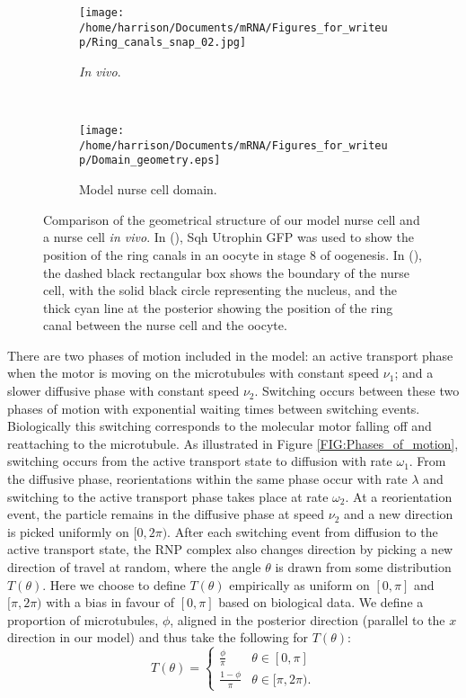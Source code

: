 \documentclass[twocolumn]{biophys}
\begin{document}
\begin{figure}[h]
 \centering
 \begin{subfigure}[b]{0.375\textwidth}
 \texttt{[image: /home/harrison/Documents/mRNA/Figures\_for\_writeup/Ring\_canals\_snap\_02.jpg]}
    \caption[]%
  {{\small \textit{In vivo}.}}    
  \label{fig:vivo}
\end{subfigure}
 ~
  \begin{subfigure}[b]{0.475\textwidth}  
      \centering 
      \texttt{[image: /home/harrison/Documents/mRNA/Figures\_for\_writeup/Domain\_geometry.eps]}
      \caption[]%
      {{\small Model nurse cell domain.}}    
      \label{fig:model}
  \end{subfigure}
  \caption{Comparison of the geometrical structure of our model nurse cell and a nurse cell \textit{in vivo}. 
  In (), Sqh Utrophin GFP was used to show the position of the ring canals in an oocyte in stage 8 of oogenesis. 
  In (), the dashed black rectangular box shows the boundary of the nurse cell, with the solid black circle representing the nucleus, and the thick cyan line at the posterior showing the position of the ring canal between the nurse cell and the oocyte.}  
  \label{FIG:geometry}      
\end{figure}

There are two phases of motion included in the model: an active transport phase when the motor is moving on the microtubules with constant speed $\nu_1$; and a slower diffusive phase with constant speed $\nu_2$.
Switching occurs between these two phases of motion with exponential waiting times between switching events.
Biologically this switching corresponds to the molecular motor falling off and reattaching to the microtubule.
As illustrated in Figure \ref{FIG:Phases_of_motion}, switching occurs from the active transport state to diffusion with rate $\omega_1$. 
From the diffusive phase, reorientations within the same phase occur with rate $\lambda$ and switching to the active transport phase takes place at rate $\omega_2$. 
At a reorientation event, the particle remains in the diffusive phase at speed $\nu_2$ and a new direction is picked uniformly on $[0,2\pi)$.
After each switching event from diffusion to the active transport state, the RNP complex also changes direction by picking a new direction of travel at random, where the angle $\theta $ is drawn from some distribution $T(\theta)$. 
Here we choose to define $T(\theta)$ empirically as uniform on $[0,\pi ]$ and $[\pi, 2\pi )$ with a bias in favour of $[0,\pi ]$ based on biological data.
We define a proportion of microtubules, $\phi$, aligned in the posterior direction (parallel to the $x$ direction in our model) and thus take the following for $T(\theta)$:
\begin{equation*}         
T(\theta) = \begin{cases} \frac{\phi}{\pi} &  \theta \in [0,\pi] \\ \frac{1-\phi}{\pi} &  \theta \in [\pi,2\pi).                       
\end{cases}
\end{equation*}
\end{document}
